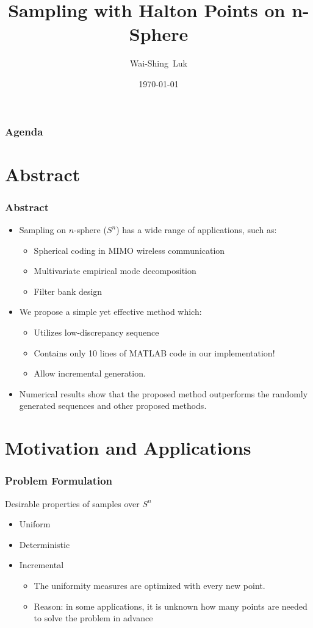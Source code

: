 \documentclass[serif]{beamer} %
\title[n_sphere]
{Sampling with Halton Points on n-Sphere}
\author[Luk]
{Wai-Shing~Luk\inst{1}} %
\institute[Fudan]
{ %
  \inst{1}%
  School of Microelectronics\\
  Fudan University
}
\date[\today] %
{\today} %
\begin{document}

\begin{frame}[fragile]
  \titlepage
\end{frame}

\begin{frame}
  \frametitle{Agenda}
  \tableofcontents
\end{frame}

\section{Abstract}
\begin{frame}[fragile]
\frametitle{Abstract}
\begin{itemize}
  \item Sampling on $n$-sphere ($S^n$) has a wide range of applications, such as:
      \begin{itemize}
        \item Spherical coding in MIMO wireless communication
        \item Multivariate empirical mode decomposition
        \item Filter bank design
      \end{itemize}
  \item We propose a simple yet effective method which:
      \begin{itemize}
        \item Utilizes low-discrepancy sequence
        \item Contains only 10 lines of MATLAB code in our implementation!
        \item Allow incremental generation.
      \end{itemize}
  \item Numerical results show that the proposed method outperforms the randomly generated sequences and other proposed methods.
\end{itemize}
\end{frame}

\section{Motivation and Applications}

\begin{frame}[fragile]
\frametitle{Problem Formulation}
Desirable properties of samples over $S^n$
\begin{itemize}
  \item Uniform
  \item Deterministic
  \item Incremental
  \begin{itemize}
    \item The uniformity measures are optimized with every new point.
    \item Reason: in some applications, it is unknown how many points are needed to solve the problem in advance
  \end{itemize}
\end{itemize}
\end{frame}
\end{document}
